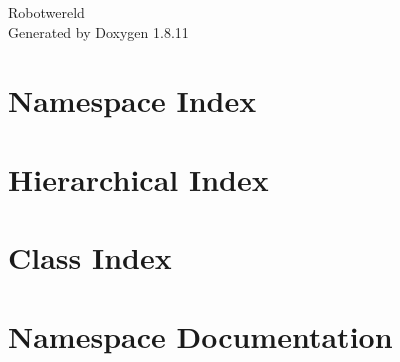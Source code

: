 \documentclass[twoside]{book}
\newcommand{\+}{\discretionary{\mbox{\scriptsize$\hookleftarrow$}}{}{}}
\newcommand{\clearemptydoublepage}{%
  \newpage{\pagestyle{empty}\cleardoublepage}%
}
\begin{document}
\hypersetup{pageanchor=false,
             bookmarksnumbered=true,
             pdfencoding=unicode
            }
\begin{titlepage}
\vspace*{7cm}
\begin{center}%
{\Large Robotwereld }\\
\vspace*{1cm}
{\large Generated by Doxygen 1.8.11}\\
\end{center}
\end{titlepage}
\clearemptydoublepage
\tableofcontents
\clearemptydoublepage
{}
\hypersetup{pageanchor=true}

\chapter{Namespace Index}

\chapter{Hierarchical Index}

\chapter{Class Index}

\chapter{Namespace Documentation}

\end{document}
